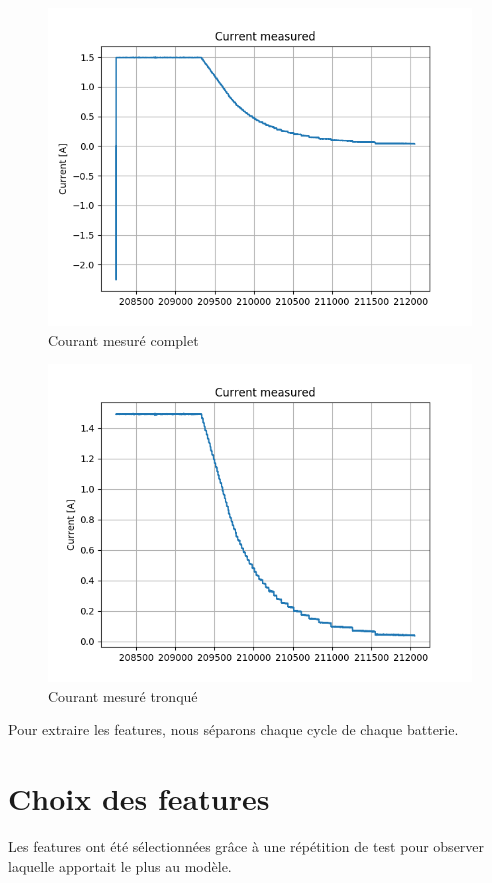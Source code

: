 \begin{figure}
    \centering
    \includegraphics[scale=0.5]{images/currentmeas.png}
    \caption{Courant mesuré complet}
    \label{fig:courFull}
\end{figure}

\begin{figure}
    \centering
    \includegraphics[scale=0.5]{images/currentmeasfilt.png}
    \caption{Courant mesuré tronqué}
    \label{fig:courTron}
\end{figure}

Pour extraire les features, nous séparons chaque cycle de chaque batterie. 

\section{Choix des features}
Les features ont été sélectionnées grâce à une répétition de test pour observer laquelle
apportait le plus au modèle.

